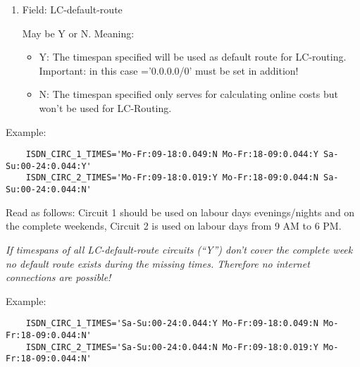 \begin{description}
\begin{enumerate}
    Costs per minute in currency units, for example 0.032 for 3.2 
    Cent per minute. The real costs are calculated in consideration of charging 
    intervals and displayed in imon-client then.
    
  \item  Field: LC-default-route
    
    May be Y or N. Meaning:

    \begin{itemize}
    \item Y: The timespan specified will be used as default route for LC-routing. 
      Important: in this case 
      ='0.0.0.0/0' must be set in addition!
        
    \item N: The timespan specified only serves for calculating online costs but 
      won't be used for LC-Routing.
    \end{itemize}

  \end{enumerate}

    Example:

\begin{small}
\begin{example}
\begin{verbatim}
    ISDN_CIRC_1_TIMES='Mo-Fr:09-18:0.049:N Mo-Fr:18-09:0.044:Y Sa-Su:00-24:0.044:Y'
    ISDN_CIRC_2_TIMES='Mo-Fr:09-18:0.019:Y Mo-Fr:18-09:0.044:N Sa-Su:00-24:0.044:N'
\end{verbatim}
\end{example}
\end{small}
    
    Read as follows: Circuit 1 should be used on labour days evenings/nights and 
    on the complete weekends, Circuit 2 is used on labour days from 9 AM to 6 PM.

    \begin{description}
    \item {}
      
     \emph{If timespans of all LC-default-route circuits (``Y'') don't cover the 
     complete week no default route exists during the missing times. Therefore 
     no internet connections are possible!}

        
    \item Example:
\begin{example}
\begin{verbatim}
    ISDN_CIRC_1_TIMES='Sa-Su:00-24:0.044:Y Mo-Fr:09-18:0.049:N Mo-Fr:18-09:0.044:N'
    ISDN_CIRC_2_TIMES='Sa-Su:00-24:0.044:N Mo-Fr:09-18:0.019:Y Mo-Fr:18-09:0.044:N'
\end{verbatim}
\end{example}
      

\end{description}
\end{description}
